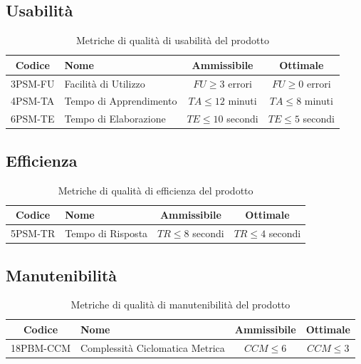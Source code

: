 \documentclass{article}
\begin{document}
    \subsection{Usabilità}
    \begin{table}[H]
        \centering
        \renewcommand{\arraystretch}{1.5} %
        \begin{tabular}{|c|l|c|c|}
            \hline
            \textbf{Codice} & \textbf{Nome} & \textbf{Ammissibile} & \textbf{Ottimale} \\
            \hline
            3PSM-FU & Facilità di Utilizzo & $FU \geq 3$ errori & $FU \geq 0$ errori \\
            4PSM-TA & Tempo di Apprendimento & $TA \leq 12$ minuti & $TA \leq 8$ minuti \\
            6PSM-TE & Tempo di Elaborazione & $TE \leq 10$ secondi & $TE \leq 5$ secondi \\
            \hline
        \end{tabular}
        \label{tab:gestione_qualità}
        \caption{Metriche di qualità di usabilità del prodotto}
    \end{table}

    \subsection{Efficienza}
    \begin{table}[H]
        \centering
        \renewcommand{\arraystretch}{1.5} %
        \begin{tabular}{|c|l|c|c|}
            \hline
            \textbf{Codice} & \textbf{Nome} & \textbf{Ammissibile} & \textbf{Ottimale} \\
            \hline
            5PSM-TR & Tempo di Risposta & $TR \leq 8$ secondi & $TR \leq 4$ secondi \\
            \hline
        \end{tabular}
        \label{tab:gestione_qualità}
        \caption{Metriche di qualità di efficienza del prodotto}
    \end{table}

    \subsection{Manutenibilità}
    \begin{table}[H]
        \centering
        \renewcommand{\arraystretch}{1.5} %
        \begin{tabular}{|c|l|c|c|}
            \hline
            \textbf{Codice} & \textbf{Nome} & \textbf{Ammissibile} & \textbf{Ottimale} \\
            \hline
            18PBM-CCM & Complessità Ciclomatica Metrica & $CCM \leq 6$ & $CCM \leq 3$ \\
            \hline
        \end{tabular}
        \label{tab:codifica}
        \caption{Metriche di qualità di manutenibilità del prodotto}
    \end{table}
\newpage
\end{document}
